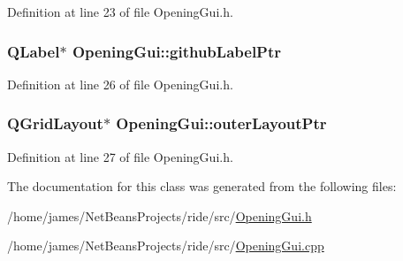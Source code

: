 Definition at line 23 of file Opening\-Gui.\-h.

\hypertarget{class_opening_gui_acc1cfdb1e87e6289a9196cfab6ff36bf}{
\subsubsection[{github\-Label\-Ptr}]{\setlength{\rightskip}{0pt plus 5cm}Q\-Label$\ast$ Opening\-Gui\-::github\-Label\-Ptr\hspace{0.3cm}{\ttfamily [private]}}}\label{class_opening_gui_acc1cfdb1e87e6289a9196cfab6ff36bf}


Definition at line 26 of file Opening\-Gui.\-h.

\hypertarget{class_opening_gui_a7d10dccf3f6292a7b28dc59341458200}{
\subsubsection[{outer\-Layout\-Ptr}]{\setlength{\rightskip}{0pt plus 5cm}Q\-Grid\-Layout$\ast$ Opening\-Gui\-::outer\-Layout\-Ptr\hspace{0.3cm}{\ttfamily [private]}}}\label{class_opening_gui_a7d10dccf3f6292a7b28dc59341458200}


Definition at line 27 of file Opening\-Gui.\-h.



The documentation for this class was generated from the following files\-:\begin{DoxyCompactItemize}
\item 
/home/james/\-Net\-Beans\-Projects/ride/src/\hyperlink{_opening_gui_8h}{Opening\-Gui.\-h}\item 
/home/james/\-Net\-Beans\-Projects/ride/src/\hyperlink{_opening_gui_8cpp}{Opening\-Gui.\-cpp}\end{DoxyCompactItemize}
